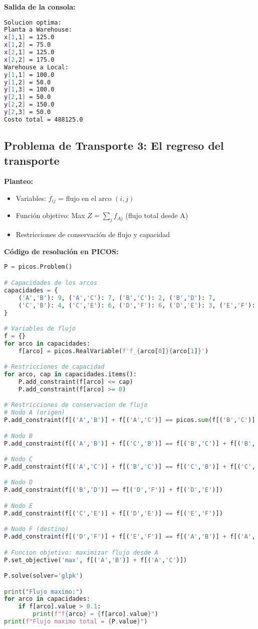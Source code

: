 \documentclass[12pt]{article}
\begin{document}
\textbf{Salida de la consola:}
\begin{lstlisting}[language=bash,backgroundcolor=\color{black},basicstyle=\color{white}\ttfamily,numbers=none]
Solucion optima:
Planta a Warehouse:
x[1,1] = 125.0
x[1,2] = 75.0
x[2,1] = 125.0
x[2,2] = 175.0
Warehouse a Local:
y[1,1] = 100.0
y[1,2] = 50.0
y[1,3] = 100.0
y[2,1] = 50.0
y[2,2] = 150.0
y[2,3] = 50.0
Costo total = 488125.0
\end{lstlisting}

\subsection{Problema de Transporte 3: El regreso del transporte}

\textbf{Planteo:}
\begin{itemize}
\item Variables: $f_{ij}$ = flujo en el arco $(i,j)$
\item Función objetivo: Max $Z = \sum_{j} f_{Aj}$ (flujo total desde A)
\item Restricciones de conservación de flujo y capacidad
\end{itemize}

\textbf{Código de resolución en PICOS:}
\begin{lstlisting}[language=Python]
P = picos.Problem()

# Capacidades de los arcos
capacidades = {
    ('A','B'): 9, ('A','C'): 7, ('B','C'): 2, ('B','D'): 7,
    ('C','B'): 4, ('C','E'): 6, ('D','F'): 6, ('D','E'): 3, ('E','F'): 9
}

# Variables de flujo
f = {}
for arco in capacidades:
    f[arco] = picos.RealVariable(f'f_{arco[0]}{arco[1]}')

# Restricciones de capacidad
for arco, cap in capacidades.items():
    P.add_constraint(f[arco] <= cap)
    P.add_constraint(f[arco] >= 0)

# Restricciones de conservacion de flujo
# Nodo A (origen)
P.add_constraint(f[('A','B')] + f[('A','C')] == picos.sum(f[('B','C')] + f[('C','B')] + f[('D','E')] + f[('E','F')]))

# Nodo B
P.add_constraint(f[('A','B')] + f[('C','B')] == f[('B','C')] + f[('B','D')])

# Nodo C
P.add_constraint(f[('A','C')] + f[('B','C')] == f[('C','B')] + f[('C','E')])

# Nodo D
P.add_constraint(f[('B','D')] == f[('D','F')] + f[('D','E')])

# Nodo E
P.add_constraint(f[('C','E')] + f[('D','E')] == f[('E','F')])

# Nodo F (destino)
P.add_constraint(f[('D','F')] + f[('E','F')] == f[('A','B')] + f[('A','C')])

# Funcion objetivo: maximizar flujo desde A
P.set_objective('max', f[('A','B')] + f[('A','C')])

P.solve(solver='glpk')

print("Flujo maximo:")
for arco in capacidades:
    if f[arco].value > 0.1:
        print(f"f{arco} = {f[arco].value}")
print(f"Flujo maximo total = {P.value}")
\end{lstlisting}
\end{document}
